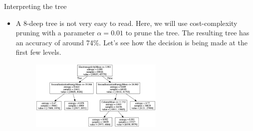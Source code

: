 \documentclass[aspectratio=169]{beamer}
\begin{document}
\begin{frame}{Interpreting the tree}
    \begin{itemize}
        \item A 8-deep tree is not very easy to read. Here, we will use cost-complexity pruning with a parameter $\alpha = 0.01$ to prune the tree. The resulting tree has an accuracy of around 74\%. Let's see how the decision is being made at the first few levels.
        \begin{figure}
            \centering
            \includegraphics[width=0.6\textwidth]{figures/metal_insulator_tree.png}
        \end{figure}
    \end{itemize}
\end{frame}
\end{document}
